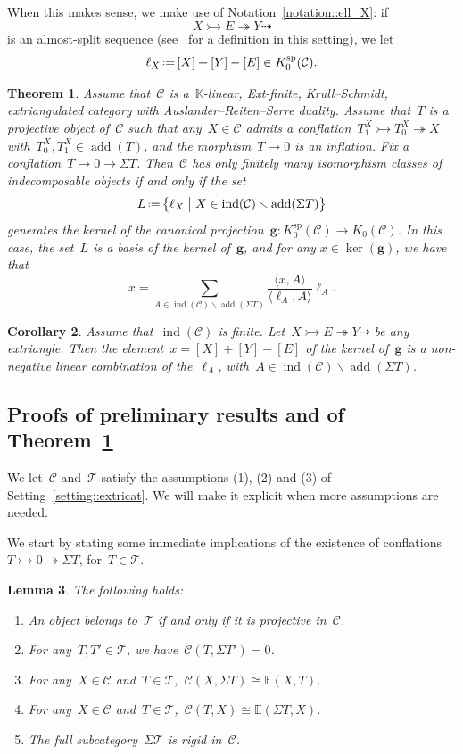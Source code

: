 \documentclass{amsart}
\newtheorem{theorem}{Theorem}[section]
\newtheorem{corollary}[theorem]{Corollary}
\newtheorem{lemma}[theorem]{Lemma}
\theoremstyle{definition}
\renewcommand{\b}[1]{{\boldsymbol{#1}}} %
\newcommand{\bigset}[2]{\big\{ #1 \;\big|\; #2 \big\}} %
\newcommand{\ssm}{\smallsetminus} %
\newcommand{\eqdef}{\mbox{\,\raisebox{0.2ex}{\scriptsize\ensuremath{\mathrm:}}\ensuremath{=}\,}} %
\newcommand{\field}{\mathbb{K}}
\newcommand{\cat}{\mathcal{C}}
\newcommand{\susp}{\Sigma}
\newcommand{\add}{\operatorname{add}}
\newcommand{\spl}{\operatorname{sp}}
\newcommand{\Ksp}{K_0^{\spl}}
\newcommand{\ind}{\operatorname{ind}}
\newcommand{\tc}{\mathcal{T}}
\newcommand{\infl}{\rightarrowtail}
\newcommand{\defl}{\twoheadrightarrow}
\newcommand{\kzero}[1]{K_0(#1)}
\begin{document}
When this makes sense, we make use of Notation~\ref{notation::ell_X}: if
\[
X \infl E \defl Y \dashrightarrow
\]
is an almost-split sequence (see~\cite{IyamaNakaokaPalu} for a definition in this setting), we let
\[
 \ell_X \eqdef [X]+[Y]-[E]\in\Ksp(\cat).
\]


\begin{theorem}\label{theorem::extricats}
Assume that~$\cat$ is a~$\field$-linear, Ext-finite, Krull--Schmidt, extriangulated category with Auslander--Reiten--Serre duality.
Assume that~$T$ is a projective object of~$\cat$ such that any~$X\in\cat$ admits a conflation~$T_1^X\infl T_0^X\defl X$ with~$T_0^X, T_1^X\in\add(T)$, and the morphism~$T\to 0$ is an inflation. Fix a conflation~$T\to 0 \to \susp T$. Then~$\cat$ has only finitely many isomorphism classes of indecomposable objects if and only if the set
\[
L \eqdef \bigset{\ell_X}{X\in \ind(\cat) \ssm \add(\susp T)}
\]
generates the kernel of the canonical projection~$\b g:\Ksp(\cat) \to \kzero{\cat}$. 
In this case, the set~$L$ is a basis of the kernel of~$\b g$, and for any $x\in \ker(\b g)$, we have that
 \[
  x= \sum_{A\in \ind(\cat) \ssm \add(\susp T)} \frac{\langle x, A \rangle}{\langle \ell_A, A \rangle} \ell_A.
 \]
\end{theorem}

\begin{corollary}\label{corollary::meshes positively generate extricats}
Assume that~$\ind(\cat)$ is finite.
Let~$X\infl E\defl Y\dashrightarrow$ be any extriangle.
Then the element~$x=[X]+[Y]-[E]$ of the kernel of~$\b g$ is a non-negative linear combination of the~$\ell_A$, with~$A\in\ind(\cat)\ssm \add(\susp T)$.
\end{corollary}

\subsection{Proofs of preliminary results and of Theorem~\ref{theorem::extricats}}
\label{sect::proofs extricats}

We let~$\cat$ and~$\tc$ satisfy the assumptions (1), (2) and (3) of Setting~\ref{setting::extricat}.
We will make it explicit when more assumptions are needed.

We start by stating some immediate implications of the existence of conflations~$T\infl 0 \defl \susp T$, for~$T\in\tc$.

\begin{lemma}\label{lemma::first consequences}
The following holds:
\begin{enumerate}[{\rm (a)}]
 \item An object belongs to~$\tc$ if and only if it is projective in~$\cat$.
 \item For any~$T,T'\in\tc$, we have~$\cat(T,\susp T')=0$.
 \item For any~$X\in\cat$ and~$T\in\tc$,~$\cat(X,\susp T)\cong\mathbb{E}(X,T)$.
 \item For any~$X\in\cat$ and~$T\in\tc$,~$\cat(T,X)\cong\mathbb{E}(\susp T,X)$.
 \item The full subcategory~$\susp\tc$ is rigid in~$\cat$.
\end{enumerate}
\end{lemma}
\end{document}
